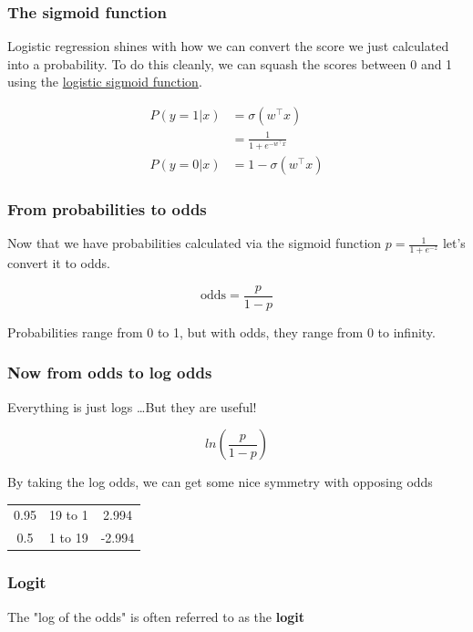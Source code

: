 \documentclass[11pt]{article}
\begin{document}
\subsubsection{The sigmoid function}

Logistic regression shines with how we can convert the score we just calculated
into a probability. To do this cleanly, we can squash the scores between 0 and 1
using the \ul{logistic sigmoid function}.

\begin{align*}
	P(y=1|x) & = \sigma(w^\top x)          \\
	         & = \frac{1}{1+e^{-w^\top x}} \\
	P(y=0|x) & = 1-\sigma(w^\top x)
\end{align*}


\subsubsection{From probabilities to odds}

Now that we have probabilities calculated via the sigmoid function
$p = \frac{1}{1+e^{-z}}$ let's convert it to odds.

\[
	\text{odds} = \frac{p}{1-p}
\]

Probabilities range from 0 to 1, but with odds, they range from 0 to infinity.

\subsubsection{Now from odds to log odds}

Everything is just logs \ldots But they are useful!

\[
	ln(\frac{p}{1-p})
\]

By taking the log odds, we can get some nice symmetry with opposing odds

\begin{center}
	\begin{tabular}{ccc}
		0.95 & 19 to 1 & 2.994  \\
		0.5  & 1 to 19 & -2.994
	\end{tabular}
\end{center}

\subsubsection*{Logit}

The "log of the odds" is often referred to as the \textbf{logit}
\end{document}
